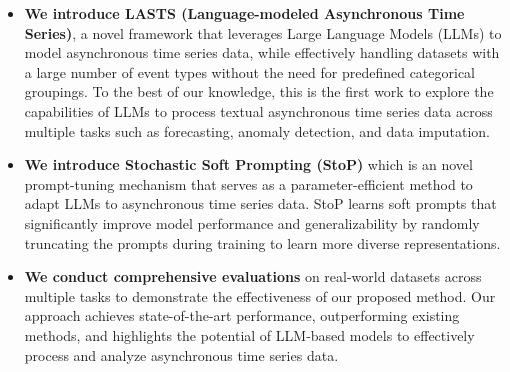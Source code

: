 \begin{itemize}
    \item \textbf{We introduce LASTS (Language-modeled Asynchronous Time Series)}, a novel framework that leverages Large Language Models (LLMs) to model asynchronous time series data, while effectively handling datasets with a large number of event types without the need for predefined categorical groupings. To the best of our knowledge, this is the first work to explore the capabilities of LLMs to process textual asynchronous time series data across multiple tasks such as forecasting, anomaly detection, and data imputation.

\item \textbf{We introduce Stochastic Soft Prompting (StoP)} which is an novel prompt-tuning mechanism that serves as a parameter-efficient method to adapt LLMs to asynchronous time series data. StoP learns soft prompts that significantly improve model performance and generalizability by randomly truncating the prompts during training to learn more diverse representations.


\item \textbf{We conduct comprehensive evaluations} on real-world datasets across multiple tasks to demonstrate the effectiveness of our proposed method. Our approach achieves state-of-the-art performance, outperforming existing methods, and highlights the potential of LLM-based models to effectively process and analyze asynchronous time series data.
\end{itemize}


